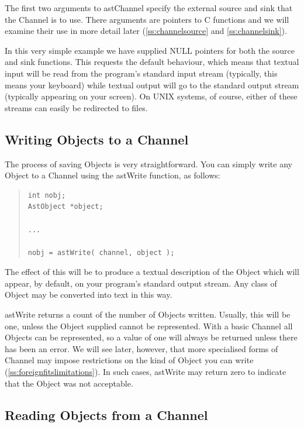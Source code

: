 \documentclass[twoside,11pt]{article}
\newcommand{\htmlref}[2]{#1}
\newcommand{\secref}[1]{\S\ref{#1}}
\renewcommand{\secref}[1]{\ref{#1}}
\begin{document}
The first two arguments to astChannel specify the external source and
sink that the Channel is to use. There arguments are pointers to C
functions and we will examine their use in more detail later
(\secref{ss:channelsource} and \secref{ss:channelsink}).

In this very simple example we have supplied NULL pointers for both
the source and sink functions. This requests the default behaviour,
which means that textual input will be read from the program's
standard input stream (typically, this means your keyboard) while
textual output will go to the standard output stream (typically
appearing on your screen). On UNIX systems, of course, either of these
streams can easily be redirected to files.

\subsection{\label{ss:writingtoachannel}Writing Objects to a Channel}

The process of saving Objects is very straightforward. You can
simply write any \htmlref{Object}{Object} to a \htmlref{Channel}{Channel} using the \htmlref{astWrite}{astWrite}
function, as follows:

\begin{quote}
\small
\begin{verbatim}
int nobj;
AstObject *object;

...

nobj = astWrite( channel, object );
\end{verbatim}
\normalsize
\end{quote}

The effect of this will be to produce a textual description of the
Object which will appear, by default, on your program's standard
output stream. Any class of Object may be converted into text in this
way.

astWrite returns a count of the number of Objects written. Usually,
this will be one, unless the Object supplied cannot be
represented. With a basic Channel all Objects can be represented, so a
value of one will always be returned unless there has been an
error. We will see later, however, that more specialised forms of
Channel may impose restrictions on the kind of Object you can write
(\secref{ss:foreignfitslimitations}). In such cases, astWrite may
return zero to indicate that the Object was not acceptable.

\subsection{\label{ss:readingfromachannel}Reading Objects from a Channel}
\end{document}
